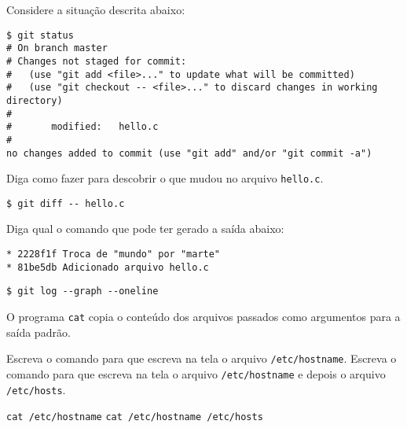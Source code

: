 \begin{Exercise}[label={0012}, difficulty={1}, origin={git}]
  Considere a situação descrita abaixo:
  \begin{lstlisting}
$ git status
# On branch master
# Changes not staged for commit:
#   (use "git add <file>..." to update what will be committed)
#   (use "git checkout -- <file>..." to discard changes in working directory)
#
#       modified:   hello.c
#
no changes added to commit (use "git add" and/or "git commit -a")
  \end{lstlisting}
  Diga como fazer para descobrir o que mudou no arquivo \lstinline+hello.c+.
\end{Exercise}
\begin{Answer}[ref={0012}]
  \begin{lstlisting}
$ git diff -- hello.c
  \end{lstlisting}
\end{Answer}

\begin{Exercise}[label={0013}, difficulty={1}, origin={git}]
  Diga qual o comando que pode ter gerado a saída abaixo:
  \begin{lstlisting}
* 2228f1f Troca de "mundo" por "marte"
* 81be5db Adicionado arquivo hello.c
  \end{lstlisting}
\end{Exercise}
\begin{Answer}[ref={0013}]
  \begin{lstlisting}
$ git log --graph --oneline
  \end{lstlisting}
\end{Answer}

\begin{Exercise}[label={0014}, difficulty={1}, origin={bash}]
  O programa \lstinline+cat+ copia o conteúdo dos arquivos passados como
  argumentos para a saída padrão.

  \Question Escreva o comando para que escreva na tela o arquivo
  \lstinline+/etc/hostname+.
  \Question Escreva o comando para que escreva na tela o arquivo
  \lstinline+/etc/hostname+ e depois o arquivo \lstinline+/etc/hosts+.
\end{Exercise}
\begin{Answer}[ref={0014}]
  \Question \lstinline+cat /etc/hostname+
  \Question \lstinline+cat /etc/hostname /etc/hosts+
\end{Answer}

